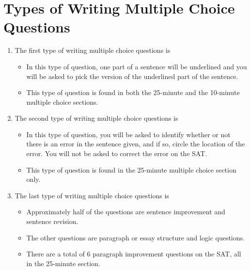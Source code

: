 \section{Types of Writing Multiple Choice Questions}

\begin{enumerate}
\item{The first type of writing multiple choice questions is \hrulefill}
\begin{itemize}
\item{In this type of question, one part of a sentence will be underlined and you will be asked to pick the version of the underlined part of the sentence.}
\item{This type of question is found in both the 25-minute and the 10-minute multiple choice sections.}
\end{itemize}


\item{The second type of writing multiple choice questions is \hrulefill}
\begin{itemize}
\item{In this type of question, you will be asked to identify whether or not there is an error
in the sentence given, and if so, circle the location of the error. You will not be asked
to correct the error on the SAT.}
\item{This type of question is found in the 25-minute multiple choice section only.}
\end{itemize} 

\item{The last type of writing multiple choice questions is \hrulefill}
\begin{itemize}
\item{Approximately half of the questions are sentence improvement and sentence revision.}
\item{The other questions are paragraph or essay structure and logic questions.}
\item{There are a total of 6 paragraph improvement questions on the SAT, all in the 25-minute section.}
\end{itemize}

\end{enumerate}